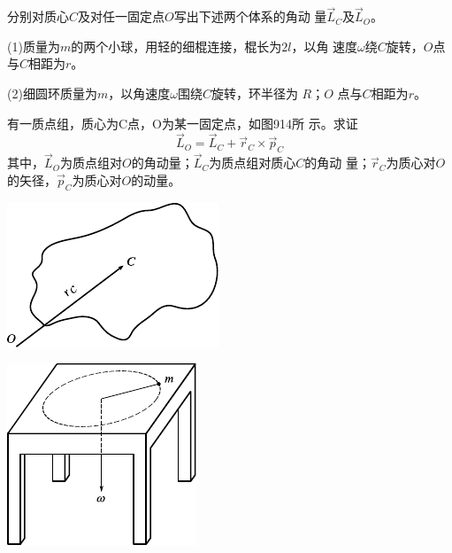 \begin{exercises}

\exercise 分别对质心$ C $及对任一固定点$ O $写出下述两个体系的角动
量$ \vec{ L } _ C $及$ \vec{ L } _ O $。

(1)质量为$ m $的两个小球，用轻的细棍连接，棍长为$ 2 l $，以角
速度$ \omega $绕$ C $旋转，$ O $点与$ C $相距为$ r $。

(2)细圆环质量为$ m $，以角速度$ \omega $围绕$ C $旋转，环半径为 $ R $；$ O $ 
点与$ C $相距为$ r $。

\exercise 有一质点组，质心为C点，O为某一固定点，如图914所
示。求证
\begin{equation*}
    \vec{ L } _ { O }  = \vec { L } _ { C } + \vec { r } _ { C } \times \vec { p } _ { C }  
\end{equation*}
其中，$ \vec{ L } _ { O } $为质点组对$ O $的角动量；$ \vec{ L } _ { C } $为质点组对质心$ C $的角动
量；$ \vec { r } _ { C } $为质心对$ O $的矢径，$ \vec { p } _ { C } $为质心对$ O $的动量。
\begin{figurex}
    \begin{minipage}[b]{0.5\linewidth}
        \centering
        \includegraphics{figure/fig09.14}
        \caption{}
        \label{fig:09.14}
    \end{minipage}
    \begin{minipage}[b]{0.5\linewidth}
        \centering
        \includegraphics{figure/fig09.15}
        \caption{}
        \label{fig:09.15}
    \end{minipage}
\end{figurex}


\end{exercises}
